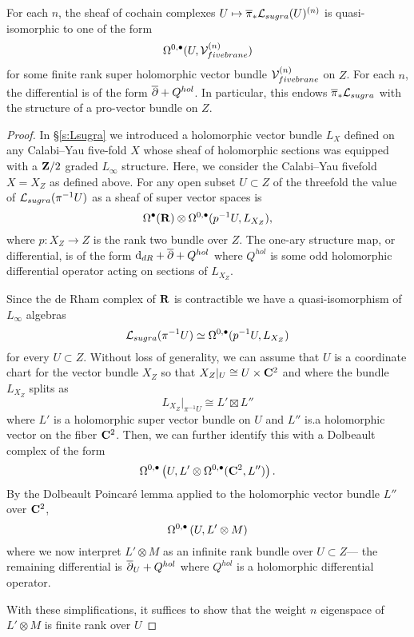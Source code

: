 \documentclass[11pt]{amsart}
\begin{document}
\begin{lem}
\label{lem:technical}
For each $n$, the sheaf of cochain complexes $U \mapsto \overline{\pi}_* \mathcal L_{sugra}(U)^{(n)}$ is quasi-isomorphic to one of the form
\[
\Omega^{0,\bullet}(U, \mathcal V_{fivebrane}^{(n)})
\]
for some finite rank super holomorphic vector bundle $\mathcal V_{fivebrane}^{(n)}$ on $Z$.
For each $n$, the differential is of the form $\overline{\partial} + Q^{hol}$.
In particular, this endows $\overline{\pi}_* \mathcal L_{sugra}$ with the structure of a pro-vector bundle on $Z$. 
\end{lem}

\begin{proof}
In \S \ref{s:Lsugra} we introduced a holomorphic vector bundle $L_X$ defined on any Calabi--Yau five-fold $X$ whose sheaf of holomorphic sections was equipped with a $\mathbf{Z}/2$ graded $L_\infty$ structure. 
Here, we consider the Calabi--Yau fivefold $X = X_Z$ as defined above.
For any open subset $U \subset Z$ of the threefold the value of $\mathcal L_{sugra}(\pi^{-1}U)$ as a sheaf of super vector spaces is 
\[
\Omega^\bullet(\mathbf{R}) \otimes \Omega^{0,\bullet}(p^{-1} U, L_{X_Z}),
\]
where $p \colon X_Z \to Z$ is the rank two bundle over $Z$. 
The one-ary structure map, or differential, is of the form ${\rm d}_{dR} + \overline{\partial} + Q^{hol}$ where $Q^{hol}$ is some odd holomorphic differential operator acting on sections of $L_{X_Z}$. 

Since the de Rham complex of $\mathbf{R}$ is contractible we have a quasi-isomorphism of $L_\infty$ algebras
\[
\mathcal L_{sugra}(\pi^{-1}U) \simeq \Omega^{0,\bullet}(p^{-1} U, L_{X_Z})
\]
for every $U \subset Z$. 
Without loss of generality, we can assume that $U$ is a coordinate chart for the vector bundle $X_Z$ so that $X_Z|_U \cong U \times \mathbf{C}^2$ and where the bundle $L_{X_Z}$ splits as 
\[
L_{X_Z}|_{\pi^{-1} U} \cong L' \boxtimes L'' 
\]
where $L'$ is a holomorphic super vector bundle on $U$ and $L''$ is.a holomorphic vector on the fiber $\mathbf{C}^2$.
Then, we can further identify this with a Dolbeault complex of the form
\[
\Omega^{0,\bullet} \left(U, L' \otimes \Omega^{0,\bullet}(\mathbf{C}^2, L'') \right) . 
\]
By the Dolbeault Poincar\'e lemma applied to the holomorphic vector bundle $L''$ over $\mathbf{C}^2$,
\[
\Omega^{0,\bullet} \left(U, L' \otimes M\right) 
\]
where we now interpret $L' \otimes M$ as an infinite rank bundle over $U \subset Z$---
the remaining differential is $\overline{\partial}_U + Q^{hol}$ where $Q^{hol}$ is a holomorphic differential operator.

With these simplifications, it suffices to show that the weight $n$ eigenspace of $L' \otimes M$ is finite rank over $U$ 
\end{proof}
\end{document}
